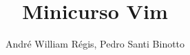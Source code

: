 \documentclass{beamer}
\title{Minicurso Vim}
\author{André William Régis, Pedro Santi Binotto}
\institute{UFSC}
\date{\the\year}
\begin{document}
\frame{\titlepage}









\end{document}

